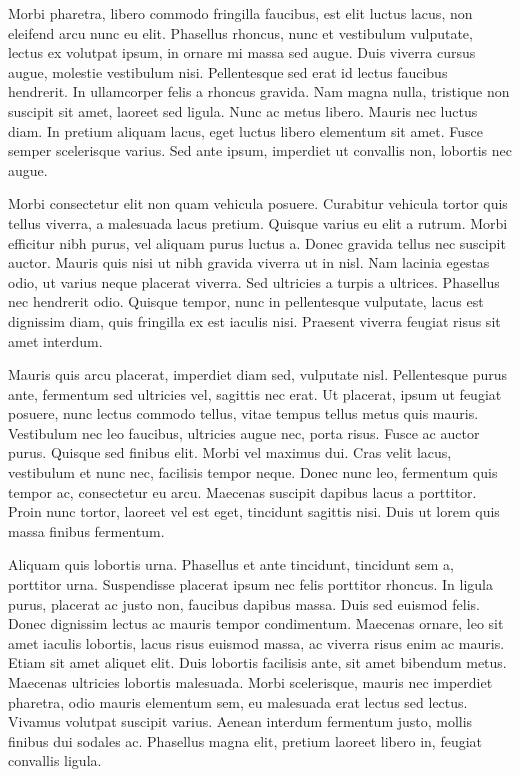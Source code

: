Morbi pharetra, libero commodo fringilla faucibus, est elit luctus lacus, non eleifend arcu nunc eu elit. Phasellus rhoncus, nunc et vestibulum vulputate, lectus ex volutpat ipsum, in ornare mi massa sed augue. Duis viverra cursus augue, molestie vestibulum nisi. Pellentesque sed erat id lectus faucibus hendrerit. In ullamcorper felis a rhoncus gravida. Nam magna nulla, tristique non suscipit sit amet, laoreet sed ligula. Nunc ac metus libero. Mauris nec luctus diam. In pretium aliquam lacus, eget luctus libero elementum sit amet. Fusce semper scelerisque varius. Sed ante ipsum, imperdiet ut convallis non, lobortis nec augue.

Morbi consectetur elit non quam vehicula posuere. Curabitur vehicula tortor quis tellus viverra, a malesuada lacus pretium. Quisque varius eu elit a rutrum. Morbi efficitur nibh purus, vel aliquam purus luctus a. Donec gravida tellus nec suscipit auctor. Mauris quis nisi ut nibh gravida viverra ut in nisl. Nam lacinia egestas odio, ut varius neque placerat viverra. Sed ultricies a turpis a ultrices. Phasellus nec hendrerit odio. Quisque tempor, nunc in pellentesque vulputate, lacus est dignissim diam, quis fringilla ex est iaculis nisi. Praesent viverra feugiat risus sit amet interdum.

Mauris quis arcu placerat, imperdiet diam sed, vulputate nisl. Pellentesque purus ante, fermentum sed ultricies vel, sagittis nec erat. Ut placerat, ipsum ut feugiat posuere, nunc lectus commodo tellus, vitae tempus tellus metus quis mauris. Vestibulum nec leo faucibus, ultricies augue nec, porta risus. Fusce ac auctor purus. Quisque sed finibus elit. Morbi vel maximus dui. Cras velit lacus, vestibulum et nunc nec, facilisis tempor neque. Donec nunc leo, fermentum quis tempor ac, consectetur eu arcu. Maecenas suscipit dapibus lacus a porttitor. Proin nunc tortor, laoreet vel est eget, tincidunt sagittis nisi. Duis ut lorem quis massa finibus fermentum.

Aliquam quis lobortis urna. Phasellus et ante tincidunt, tincidunt sem a, porttitor urna. Suspendisse placerat ipsum nec felis porttitor rhoncus. In ligula purus, placerat ac justo non, faucibus dapibus massa. Duis sed euismod felis. Donec dignissim lectus ac mauris tempor condimentum. Maecenas ornare, leo sit amet iaculis lobortis, lacus risus euismod massa, ac viverra risus enim ac mauris. Etiam sit amet aliquet elit. Duis lobortis facilisis ante, sit amet bibendum metus. Maecenas ultricies lobortis malesuada. Morbi scelerisque, mauris nec imperdiet pharetra, odio mauris elementum sem, eu malesuada erat lectus sed lectus. Vivamus volutpat suscipit varius. Aenean interdum fermentum justo, mollis finibus dui sodales ac. Phasellus magna elit, pretium laoreet libero in, feugiat convallis ligula.

